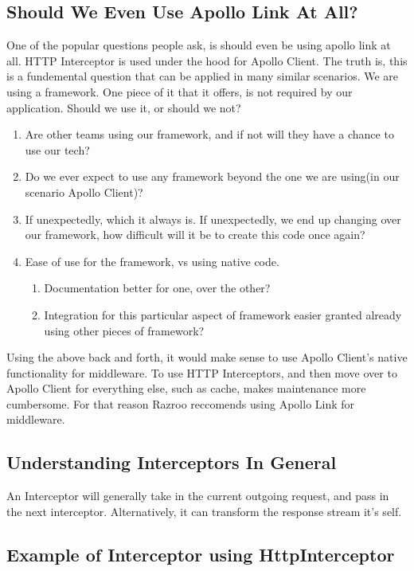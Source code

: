 \subsection{Should We Even Use Apollo Link At All?}
One of the popular questions people ask, is should even be using apollo link at 
all. HTTP Interceptor is used under the hood for Apollo Client. The truth is, 
this is a fundemental question that can be applied in many similar scenarios. 
We are using a framework. One piece of it that it offers, is not required by 
our application. Should we use it, or should we not? 
\begin{enumerate}
  \item Are other teams using our framework, and if not will they have a chance
  to use our tech? 
  \item Do we ever expect to use any framework beyond the one we are using(in 
  our scenario Apollo Client)? 
  \item If unexpectedly, which it always is. If unexpectedly, we end up 
  changing over our framework, how difficult will it be to create this code 
  once again? 
  \item Ease of use for the framework, vs using native code. 
  \begin{enumerate}
    \item Documentation better for one, over the other? 
    \item Integration for this particular aspect of framework easier granted 
    already using other pieces of framework? 
  \end{enumerate}
\end{enumerate}

Using the above back and forth, it would make sense to use Apollo Client's 
native functionality for middleware. To use HTTP Interceptors, and then 
move over to Apollo Client for everything else, such as cache, makes 
maintenance more cumbersome. For that reason Razroo reccomends using Apollo
Link for middleware.

\subsection{Understanding Interceptors In General}
An Interceptor will generally take in the current outgoing request, and pass 
in the next interceptor. Alternatively, it can transform the response stream 
it's self. 

\subsection{Example of Interceptor using HttpInterceptor}

